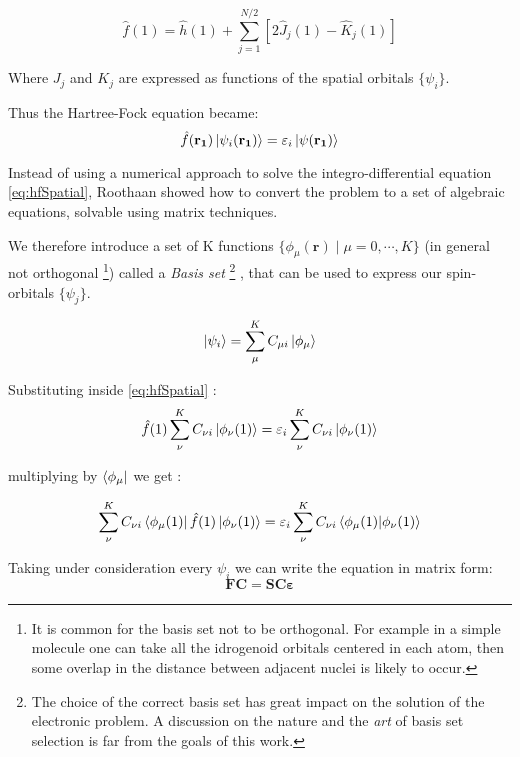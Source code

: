 \documentclass[a4paper,12pt]{article}
\begin{document}
\begin{equation}
\hat{f}(1) = \hat{h}(1) +\sum_{j=1}^{N/2}[2\hat J_j(1)-\hat K_j(1)]
\end{equation}

Where $J_j$ and $K_j$ are expressed as functions of the spatial orbitals $\{\psi_i\}$.

Thus the Hartree-Fock equation became:
\begin{equation}\label{eq:hfSpatial}
	\hat{f}(\mathbf{r_1}) \ket{\psi_i(\mathbf{r_1})} = \varepsilon_i \ket{\psi(\mathbf{r_1})}
\end{equation}

Instead of using a numerical approach to solve the integro-differential equation \eqref{eq:hfSpatial}, Roothaan showed how to convert the problem to a set of algebraic equations, solvable using matrix techniques.

We therefore introduce a set of K functions $\{ \phi_{\mu}(\mathbf{r}) \mid \mu = 0,\cdots,K\}$ (in general not orthogonal \footnote{It is common for the basis set not to be orthogonal. For example in a simple molecule one can take all the idrogenoid orbitals centered in each atom, then some overlap in the distance between adjacent nuclei is likely to occur.}) called a \textit{Basis set} \footnote{ The choice of the correct basis set has great impact on the solution of the electronic problem. A discussion on the nature and the \textit{art} of basis set selection is far from the goals of this work.} , that can be used to express our spin-orbitals $\{\psi_j\}$.

\begin{equation}
	\ket{\psi_i} = \sum_{\mu}^{K} C_{\mu i} \ket{\phi_{\mu}}
\end{equation}

Substituting inside \eqref{eq:hfSpatial} :
\begin{equation}
	\hat{f}(1) \sum_{\nu}^{K} C_{\nu i} \ket{\phi_{\nu}(1)}  = \varepsilon_i \sum_{\nu}^{K} C_{\nu i} \ket{\phi_{\nu}(1)}
\end{equation}

multiplying by $\bra{\phi_{\mu}}$ we get :

\begin{equation}
	 \sum_{\nu}^{K} C_{\nu i} \bra{\phi_{\mu}(1)}\hat{f}(1)\ket{\phi_{\nu}(1)}  
	 = \varepsilon_i \sum_{\nu}^{K} C_{\nu i} \bra{\phi_{\mu}(1)}\ket{\phi_{\nu}(1)}
\end{equation}

Taking under consideration every $\psi_i$ we can write the equation in matrix form:
\begin{equation}
\boxed{
\mathbf{FC} = \mathbf{SC\varepsilon}
}
\end{equation}
\end{document}
